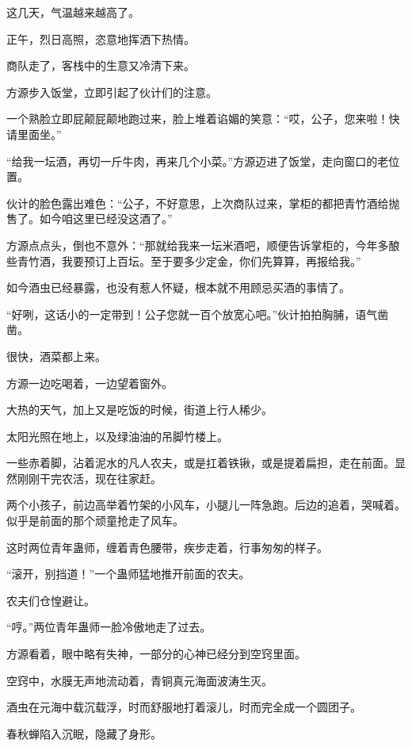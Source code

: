 
\begin{this_body}

这几天，气温越来越高了。

正午，烈日高照，恣意地挥洒下热情。

商队走了，客栈中的生意又冷清下来。

方源步入饭堂，立即引起了伙计们的注意。

一个熟脸立即屁颠屁颠地跑过来，脸上堆着谄媚的笑意：“哎，公子，您来啦！快请里面坐。”

“给我一坛酒，再切一斤牛肉，再来几个小菜。”方源迈进了饭堂，走向窗口的老位置。

伙计的脸色露出难色：“公子，不好意思，上次商队过来，掌柜的都把青竹酒给抛售了。如今咱这里已经没这酒了。”

方源点点头，倒也不意外：“那就给我来一坛米酒吧，顺便告诉掌柜的，今年多酿些青竹酒，我要预订上百坛。至于要多少定金，你们先算算，再报给我。”

如今酒虫已经暴露，也没有惹人怀疑，根本就不用顾忌买酒的事情了。

“好咧，这话小的一定带到！公子您就一百个放宽心吧。”伙计拍拍胸脯，语气凿凿。

很快，酒菜都上来。

方源一边吃喝着，一边望着窗外。

大热的天气，加上又是吃饭的时候，街道上行人稀少。

太阳光照在地上，以及绿油油的吊脚竹楼上。

一些赤着脚，沾着泥水的凡人农夫，或是扛着铁锹，或是提着扁担，走在前面。显然刚刚干完农活，现在往家赶。

两个小孩子，前边高举着竹架的小风车，小腿儿一阵急跑。后边的追着，哭喊着。似乎是前面的那个顽童抢走了风车。

这时两位青年蛊师，缠着青色腰带，疾步走着，行事匆匆的样子。

“滚开，别挡道！”一个蛊师猛地推开前面的农夫。

农夫们仓惶避让。

“哼。”两位青年蛊师一脸冷傲地走了过去。

方源看着，眼中略有失神，一部分的心神已经分到空窍里面。

空窍中，水膜无声地流动着，青铜真元海面波涛生灭。

酒虫在元海中载沉载浮，时而舒服地打着滚儿，时而完全成一个圆团子。

春秋蝉陷入沉眠，隐藏了身形。


\end{this_body}
